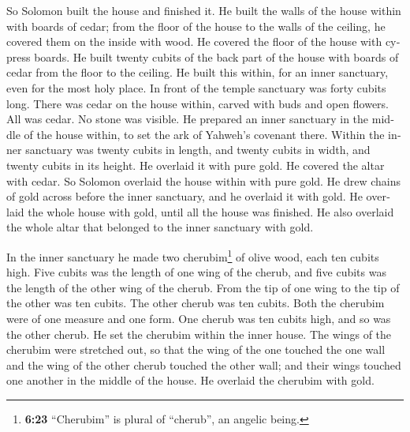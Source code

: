 \begin{paracol}{2}
\begin{otherlanguage}{english}
 So Solomon built the house and finished it.
 He built the walls of the house within with boards of
cedar; from the floor of the house to the walls of the ceiling, he
covered them on the inside with wood. He covered the floor of the house
with cypress boards.  He built twenty cubits of the back
part of the house with boards of cedar from the floor to the ceiling. He
built this within, for an inner sanctuary, even for the most holy place.
 In front of the temple sanctuary was forty cubits long.
 There was cedar on the house within, carved with buds
and open flowers. All was cedar. No stone was visible. 
He prepared an inner sanctuary in the middle of the house within, to set
the ark of Yahweh's covenant there.  Within the inner
sanctuary was twenty cubits in length, and twenty cubits in width, and
twenty cubits in its height. He overlaid it with pure gold. He covered
the altar with cedar.  So Solomon overlaid the house
within with pure gold. He drew chains of gold across before the inner
sanctuary, and he overlaid it with gold.  He overlaid the
whole house with gold, until all the house was finished. He also
overlaid the whole altar that belonged to the inner sanctuary with gold.

 In the inner sanctuary he made two cherubim\footnote{\textbf{6:23}
  ``Cherubim'' is plural of ``cherub'', an angelic being.} of olive
wood, each ten cubits high.  Five cubits was the length
of one wing of the cherub, and five cubits was the length of the other
wing of the cherub. From the tip of one wing to the tip of the other was
ten cubits.  The other cherub was ten cubits. Both the
cherubim were of one measure and one form.  One cherub
was ten cubits high, and so was the other cherub.  He set
the cherubim within the inner house. The wings of the cherubim were
stretched out, so that the wing of the one touched the one wall and the
wing of the other cherub touched the other wall; and their wings touched
one another in the middle of the house.  He overlaid the
cherubim with gold.


\end{otherlanguage}
\end{paracol}
